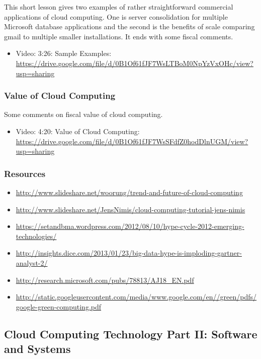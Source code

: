 This short lesson gives two examples of rather straightforward
commercial applications of cloud computing. One is server consolidation
for multiple Microsoft database applications and the second is the
benefits of scale comparing gmail to multiple smaller installations. It
ends with some fiscal comments.

\begin{itemize}
\tightlist
\item
  Video: 3:26: Sample Examples:
  \url{https://drive.google.com/file/d/0B1Of61fJF7WsLTBoM0NpYzVxOHc/view?usp=sharing}
\end{itemize}

\subsubsection{Value of Cloud Computing}\label{value-of-cloud-computing}

Some comments on fiscal value of cloud computing.

\begin{itemize}
\tightlist
\item
  Video: 4:20: Value of Cloud Computing:
  \url{https://drive.google.com/file/d/0B1Of61fJF7WsSFdfZ0hodDlnUGM/view?usp=sharing}
\end{itemize}

\subsubsection{Resources}\label{resources-1}

\begin{itemize}
\tightlist
\item
  \url{http://www.slideshare.net/woorung/trend-and-future-of-cloud-computing}
\item
  \url{http://www.slideshare.net/JensNimis/cloud-computing-tutorial-jens-nimis}
\item
  \url{https://setandbma.wordpress.com/2012/08/10/hype-cycle-2012-emerging-technologies/}
\item
  \url{http://insights.dice.com/2013/01/23/big-data-hype-is-imploding-gartner-analyst-2/}
\item
  \url{http://research.microsoft.com/pubs/78813/AJ18_EN.pdf}
\item
  \url{http://static.googleusercontent.com/media/www.google.com/en//green/pdfs/google-green-computing.pdf}
\end{itemize}

\subsection{Cloud Computing Technology Part II: Software and
Systems}\label{cloud-computing-technology-part-ii-software-and-systems}

